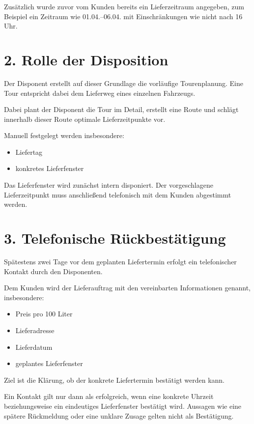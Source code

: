 \documentclass[a4paper,11pt]{article}
\begin{document}
	Zusätzlich wurde zuvor vom Kunden bereits ein Lieferzeitraum angegeben,
	zum Beispiel ein Zeitraum wie 01.04.--06.04. mit Einschränkungen wie
	\glqq nicht nach 16 Uhr\grqq.
	
	\section*{2. Rolle der Disposition}
	
	Der Disponent erstellt auf dieser Grundlage die vorläufige Tourenplanung.
	Eine Tour entspricht dabei dem Lieferweg eines einzelnen Fahrzeugs.
	
	Dabei plant der Disponent die Tour im Detail, erstellt eine Route und schlägt
	innerhalb dieser Route optimale Lieferzeitpunkte vor.
	
	Manuell festgelegt werden insbesondere:
	
	\begin{itemize}
		\item Liefertag
		\item konkretes Lieferfenster
	\end{itemize}
	
	Das Lieferfenster wird zunächst intern disponiert. Der vorgeschlagene
	Lieferzeitpunkt muss anschließend telefonisch mit dem Kunden abgestimmt werden.
	
	\section*{3. Telefonische Rückbestätigung}
	
	Spätestens zwei Tage vor dem geplanten Liefertermin erfolgt ein telefonischer
	Kontakt durch den Disponenten.
	
	Dem Kunden wird der Lieferauftrag mit den vereinbarten Informationen genannt,
	insbesondere:
	
	\begin{itemize}
		\item Preis pro 100 Liter
		\item Lieferadresse
		\item Lieferdatum
		\item geplantes Lieferfenster
	\end{itemize}
	
	Ziel ist die Klärung, ob der konkrete Liefertermin bestätigt werden kann.
	
	Ein Kontakt gilt nur dann als erfolgreich, wenn eine konkrete Uhrzeit
	beziehungsweise ein eindeutiges Lieferfenster bestätigt wird. Aussagen wie
	eine spätere Rückmeldung oder eine unklare Zusage gelten nicht als Bestätigung.
	
\end{document}
